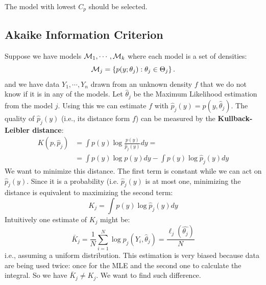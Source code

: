 \documentclass[12pt, letterpaper]{article}
\theoremstyle{definition}
\begin{document}
The model with lowest $C_p$ should be selected.

\subsection{Akaike Information Criterion}
Suppose we have models $\CMcal{M}_1, \cdots, \CMcal{M}_k$ where each model is a set of densities:
\begin{equation}
\CMcal{M}_j = \left\lbrace p(y;\theta_j):\theta_j \in \Theta_j\right\rbrace.
\end{equation}
and we have data $Y_1,\cdots, Y_n$ drawn from an unknown density $f$ that we do not know if it is in any of the models. Let $\hat{\theta}_j$ be the Maximum Likelihood estimation from the model $j$. Using this we can estimate $f$ with $\hat{p}_j(y) = p(y, \hat{\theta}_j)$. The quality of $\hat{p}_j(y)$ (i.e., its distance form $f$) can be measured by the \textbf{Kullback-Leibler distance}:
\begin{equation}
\begin{aligned}
K(p, \hat{p}_j) &= \int p(y) \log \frac{p(y)}{\hat{p}_j(y)} dy = \\
&=\int p(y) \log p(y) dy  - \int p(y) \log \hat{p}_j(y) dy 
\end{aligned}
\end{equation}
We want to minimize this distance. The first term is constant while we can act on $ \hat{p}_j(y)$. Since it is a probability (i.e.  $\hat{p}_j(y)$ is at most one, minimizing the distance is equivalent to maximizing the second term:
\begin{equation}
K_j = \int p(y) \log \hat{p}_j(y) dy 
\end{equation}
Intuitively one estimate of $K_j$ might be:
\begin{equation}
\bar{K}_j = \frac{1}{N} \sum_{i=1}^N \log p_j(Y_i,\hat{\theta}_j)  = \frac{\ell_j(\hat{\theta_j})}{N} 
\end{equation}
i.e., assuming a uniform distribution. This estimation is very biased because data are being used twice: once for the MLE and the second one to calculate the integral. So we have $\bar{K}_j \ne K_j$. We want to find such difference.
\end{document}
